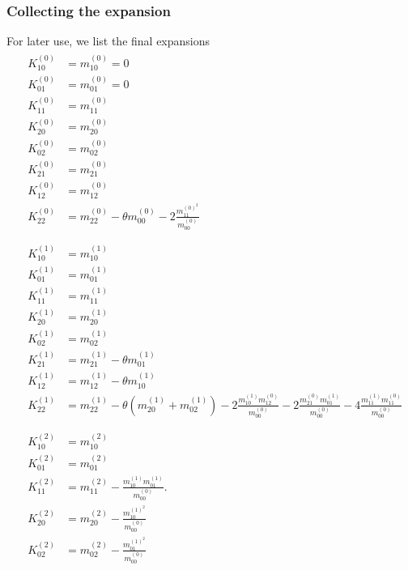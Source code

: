 \subsubsection{Collecting the expansion}
\label{subs:Collecting the expansion}
For later use, we list the final expansions
\begin{align}
  \label{eq: expansions of cumulants zeroth order}
  &\begin{aligned}
    K_{10}^{(0)} & = m_{10}^{(0)}=0\\
    K_{01}^{(0)} & = m_{01}^{(0)}=0\\
    K_{11}^{(0)} & = m_{11}^{(0)}\\
    K_{20}^{(0)} & = m_{20}^{(0)}\\
    K_{02}^{(0)} & = m_{02}^{(0)}\\
    K_{21}^{(0)} & = m_{21}^{(0)}\\
    K_{12}^{(0)} & = m_{12}^{(0)}\\
    K_{22}^{(0)} & = m_{22}^{(0)} - \theta m_{00}^{(0)} - 2\frac{ m_{11}^{{(0)}^2}}{m_{00}^{(0)}}
  \end{aligned}
  \\\nonumber&\\&
  \label{eq: expansions of cumulants first order}
  \begin{aligned}
    K_{10}^{(1)} & = m_{10}^{(1)}\\
    K_{01}^{(1)} & = m_{01}^{(1)}\\
    K_{11}^{(1)} & = m_{11}^{(1)} \\
    K_{20}^{(1)} & = m_{20}^{(1)} \\
    K_{02}^{(1)} & = m_{02}^{(1)} \\
    K_{21}^{(1)} & = m_{21}^{(1)} - \theta m_{01}^{(1)} \\
    K_{12}^{(1)} & = m_{12}^{(1)} - \theta m_{10}^{(1)} \\
    K_{22}^{(1)} & = m_{22}^{(1)}
      - \theta (m_{20}^{(1)} + m_{02}^{(1)})
      - 2\frac{ m_{10}^{(1)} m_{12}^{(0)} }{m_{00}^{(0)}}
      - 2\frac{ m_{21}^{(0)} m_{01}^{(1)} }{m_{00}^{(0)}}
      - 4\frac{ m_{11}^{(1)} m_{11}^{(0)} }{m_{00}^{(0)}}
  \end{aligned}
\\\nonumber&\\&
  \label{eq: expansions of cumulants second order}
  \begin{aligned}
    K_{10}^{(2)} & = m_{10}^{(2)}\\
    K_{01}^{(2)} & = m_{01}^{(2)}\\
    K_{11}^{(2)} & = m_{11}^{(2)} - \frac{ m_{10}^{(1)}m_{01}^{(1)}}{m_{00}^{(0)}}. \\
    K_{20}^{(2)} & = m_{20}^{(2)} - \frac{ m_{10}^{{(1)}^2}}{m_{00}^{(0)}} \\
    K_{02}^{(2)} & = m_{02}^{(2)} - \frac{ m_{01}^{{(1)}^2}}{m_{00}^{(0)}}
  \end{aligned}
\end{align}
